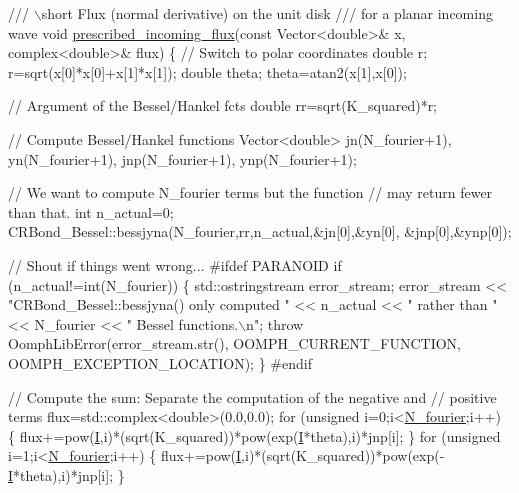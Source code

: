  
\begin{DoxyCodeInclude}
 \textcolor{comment}{/// \(\backslash\)short Flux (normal derivative) on the unit disk}
\textcolor{comment}{ /// for a planar incoming wave}
\textcolor{comment}{} \textcolor{keywordtype}{void} \hyperlink{namespaceGlobalParameters_a5183de63b992338ee60bb4da78a45039}{prescribed\_incoming\_flux}(\textcolor{keyword}{const} Vector<double>& x, 
                               complex<double>& flux)
 \{
  \textcolor{comment}{// Switch to polar coordinates}
  \textcolor{keywordtype}{double} r;
  r=sqrt(x[0]*x[0]+x[1]*x[1]);
  \textcolor{keywordtype}{double} theta;
  theta=atan2(x[1],x[0]);
  
  \textcolor{comment}{// Argument of the Bessel/Hankel fcts}
  \textcolor{keywordtype}{double} rr=sqrt(K\_squared)*r;  
  
  \textcolor{comment}{// Compute Bessel/Hankel functions}
  Vector<double> jn(N\_fourier+1), yn(N\_fourier+1),
   jnp(N\_fourier+1), ynp(N\_fourier+1);

  \textcolor{comment}{// We want to compute N\_fourier terms but the function}
  \textcolor{comment}{// may return fewer than that.}
  \textcolor{keywordtype}{int} n\_actual=0;
  CRBond\_Bessel::bessjyna(N\_fourier,rr,n\_actual,&jn[0],&yn[0],
                          &jnp[0],&ynp[0]);
  
  \textcolor{comment}{// Shout if things went wrong...}
\textcolor{preprocessor}{#ifdef PARANOID}
  \textcolor{keywordflow}{if} (n\_actual!=\textcolor{keywordtype}{int}(N\_fourier))
   \{
    std::ostringstream error\_stream; 
    error\_stream << \textcolor{stringliteral}{"CRBond\_Bessel::bessjyna() only computed "}
                 << n\_actual << \textcolor{stringliteral}{" rather than "} << N\_fourier 
                 << \textcolor{stringliteral}{" Bessel functions.\(\backslash\)n"};    
    \textcolor{keywordflow}{throw} OomphLibError(error\_stream.str(),
                        OOMPH\_CURRENT\_FUNCTION,
                        OOMPH\_EXCEPTION\_LOCATION);
   \}
\textcolor{preprocessor}{#endif}
  
  \textcolor{comment}{// Compute the sum: Separate the computation of the negative and }
  \textcolor{comment}{// positive terms}
  flux=std::complex<double>(0.0,0.0);
  \textcolor{keywordflow}{for} (\textcolor{keywordtype}{unsigned} i=0;i<\hyperlink{namespaceGlobalParameters_ae4df03bf0ffa55b741ac846ca7b6c155}{N\_fourier};i++)
   \{
    flux+=pow(\hyperlink{namespaceGlobalParameters_a7642bd7303d39de0d680340586b7df60}{I},i)*(sqrt(K\_squared))*pow(exp(\hyperlink{namespaceGlobalParameters_a7642bd7303d39de0d680340586b7df60}{I}*theta),i)*jnp[i];
   \}
  \textcolor{keywordflow}{for} (\textcolor{keywordtype}{unsigned} i=1;i<\hyperlink{namespaceGlobalParameters_ae4df03bf0ffa55b741ac846ca7b6c155}{N\_fourier};i++)
   \{
    flux+=pow(\hyperlink{namespaceGlobalParameters_a7642bd7303d39de0d680340586b7df60}{I},i)*(sqrt(K\_squared))*pow(exp(-\hyperlink{namespaceGlobalParameters_a7642bd7303d39de0d680340586b7df60}{I}*theta),i)*jnp[i];
   \}



\end{DoxyCodeInclude}
